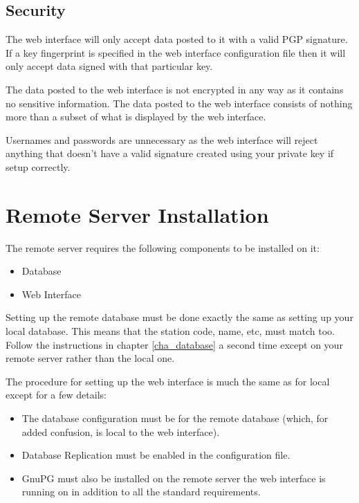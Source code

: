 \documentclass[a4paper,10pt,draft]{book}
\begin{document}
\subsection{Security}
\label{sec_dbr_security}

The web interface will only accept data posted to it with a valid PGP signature. If a key fingerprint is specified in the web interface configuration file then it will only accept data signed with that particular key.

The data posted to the web interface is not encrypted in any way as it contains no sensitive information. The data posted to the web interface consists of nothing more than a subset of what is displayed by the web interface.

Usernames and passwords are unnecessary as the web interface will reject anything that doesn't have a valid signature created using your private key if setup correctly.


\section{Remote Server Installation}

The remote server requires the following components to be installed on it:
\begin{itemize}
\item Database
\item Web Interface
\end{itemize}

Setting up the remote database must be done exactly the same as setting up your local database. This means that the station code, name, etc, must match too. Follow the instructions in chapter \ref{cha_database} a second time except on your remote server rather than the local one.

The procedure for setting up the web interface is much the same as for local except for a few details:
\begin{itemize}
\item The database configuration must be for the remote database (which, for added confusion, is local to the web interface).
\item Database Replication must be enabled in the configuration file.
\item GnuPG must also be installed on the remote server the web interface is running on in addition to all the standard requirements.
\end{itemize}
\end{document}
